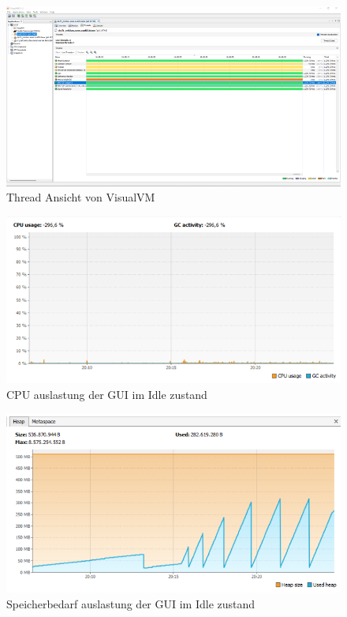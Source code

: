 \documentclass{article}
\begin{document}
\begin{figure}
  \centering
  \includegraphics{VisualVM_Threads.png}
  \caption{Thread Ansicht von VisualVM}
  \label{fig:VisualVM_Threads}
\end{figure}

\begin{figure}
  \centering
  \includegraphics{GUI_CPU_idle.png}
  \caption{CPU auslastung der GUI im Idle zustand}
  \label{fig:GUI_CPU_idle}
\end{figure}

\begin{figure}
  \centering
  \includegraphics{GUI_Idle.png}
  \caption{Speicherbedarf auslastung der GUI im Idle zustand}
  \label{fig:GUI_MEM_idle}
\end{figure}
\end{document}
